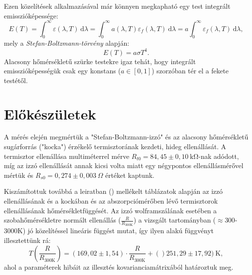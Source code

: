 \documentclass[a4paper, 12pt]{article}
\begin{document}
    Ezen közelítések alkalmazásával már könnyen megkapható egy test integrált emisszióképessége:
    \begin{equation}
        E(T)=\int_{0}^{\infty} \varepsilon(\lambda, T)~\mathrm{d}\lambda=\int_{0}^{\infty} a(\lambda, T)\varepsilon_f(\lambda, T)~\mathrm{d}\lambda=a \int_{0}^{\infty} \varepsilon_f(\lambda, T)~\mathrm{d}\lambda,
    \end{equation}
    mely a \textit{Stefan-Boltzmann-törvény} alapján:
    \begin{equation}
        E(T)=a\sigma T^4.
    \end{equation}
    Alacsony hőmérsékletű szürke testekre igaz tehát, hogy integrált emisszióképességük csak egy konstans ($a\in[0, 1]$) szorzóban tér el a fekete testétől.

    \section{Előkészületek}
    A mérés elején megmértük a "Stefan-Boltzmann-izzó" és az alacsony hőmérsékletű sugárforrás ("kocka") érzékelő termisztorának kezdeti, hideg ellenállását.
    A termisztor ellenállása multiméterrel mérve $R_{t0}=84,45\pm 0,10~\mathrm{k\Omega}$-nak adódott, míg az izzó ellenállását annak kicsi volta miatt egy négypontos ellenállásmérővel mértük és $R_{s0}=0,274\pm 0,003~\Omega$ értéket kaptunk.

    Kiszámítottuk továbbá a leiratban (\cite{leir}) mellékelt táblázatok alapján az izzó ellenállásának és a kockában és az abszorpciómérőben lévő termisztorok ellenállásának hőmérsékletfüggését.
    Az izzó wolframszálának esetében a szobahőmérsékletre normált ellenállás ($\frac{R}{R_{300\mathrm{K}}}$) a vizsgált tartományban ($\approx300$-$3000$K) jó közelítéssel lineáris függést mutat, így ilyen alakú függvényt illesztettünk rá:
    \begin{equation}
        T\left(\frac{R}{R_{300\mathrm{K}}}\right)=(169,02\pm 1,54)\cdot\frac{R}{R_{300\mathrm{K}}}+()251,29\pm17,92)~\mathrm{K},
    \end{equation}
    ahol a paraméterek hibáit az illesztés kovarianciamátrixából határoztuk meg.
\end{document}
